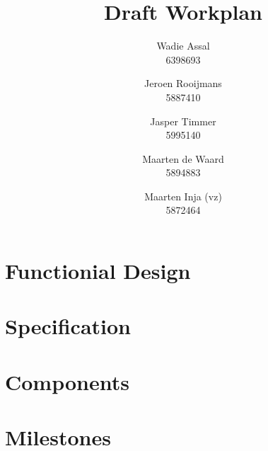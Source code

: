 \documentclass[a4paper, notitlepage]{article}
\title{Draft Workplan}
\author{Wadie Assal \\ 6398693 \and Jeroen Rooijmans \\ 5887410 \and Jasper Timmer \\ 5995140 \and Maarten de Waard \\ 5894883 \and Maarten Inja (vz) \\ 5872464}
\begin{document}
\maketitle

\section{Functionial Design}


\section{Specification}


\section{Components}


\section{Milestones}

\end{document}
